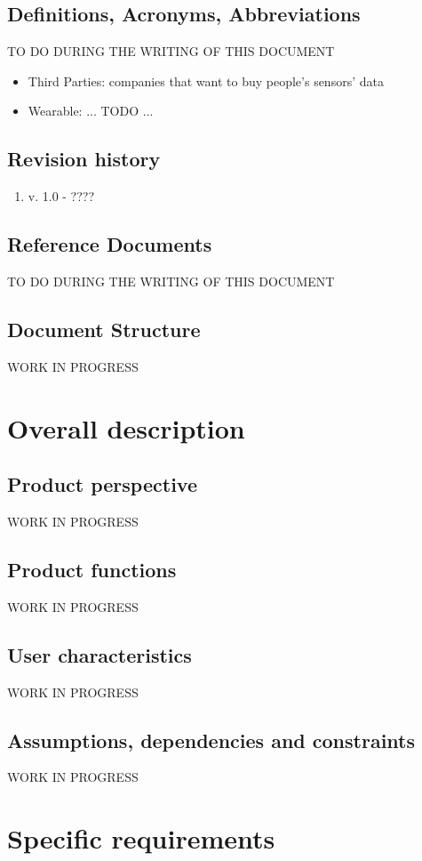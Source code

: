\documentclass{report}
\begin{document}
		\section{Definitions, Acronyms, Abbreviations}
		TO DO DURING THE WRITING OF THIS DOCUMENT
		\begin{itemize}
		\item Third Parties: companies that want to buy people's sensors' data
		\item Wearable: ... TODO ...
		\end{itemize}
		\section{Revision history}
		\begin{enumerate}
			\item v. 1.0 - ????
		\end{enumerate}
		\section{Reference Documents}
		TO DO DURING THE WRITING OF THIS DOCUMENT
		\section{Document Structure}
		WORK IN PROGRESS
	\chapter{Overall description}
		\section{Product perspective}
		WORK IN PROGRESS
		\section{Product functions}
		WORK IN PROGRESS
		\section{User characteristics}
		WORK IN PROGRESS
		\section{Assumptions, dependencies and constraints}
		WORK IN PROGRESS
	\chapter{Specific requirements}
\end{document}
